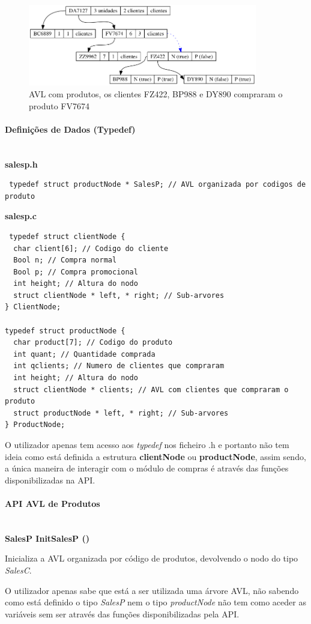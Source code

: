 \documentclass[10pt] {article}
\begin{document}
\begin{figure}[ht!]
\centering
\includegraphics[width=100mm]{avl_salesp.png}
\caption{AVL com produtos, os clientes FZ422, BP988 e DY890 compraram o produto FV7674}
\end{figure}
 
 \paragraph {Definições de Dados (Typedef)}\mbox{}\\
 \textbf{salesp.h}
 \begin{lstlisting}
 typedef struct productNode * SalesP; // AVL organizada por codigos de produto
 \end{lstlisting}
 \textbf{salesp.c}
 \begin{lstlisting}
 typedef struct clientNode {
  char client[6]; // Codigo do cliente
  Bool n; // Compra normal
  Bool p; // Compra promocional
  int height; // Altura do nodo
  struct clientNode * left, * right; // Sub-arvores
} ClientNode;

typedef struct productNode {
  char product[7]; // Codigo do produto
  int quant; // Quantidade comprada
  int qclients; // Numero de clientes que compraram
  int height; // Altura do nodo
  struct clientNode * clients; // AVL com clientes que compraram o produto
  struct productNode * left, * right; // Sub-arvores
} ProductNode;
\end{lstlisting}

 \par O utilizador apenas tem acesso aos \emph{typedef} nos ficheiro .h e portanto não tem ideia como está
 definida a estrutura \textbf{clientNode} ou \textbf{productNode}, assim sendo, a única maneira de interagir com o 
 módulo de compras é através das funções disponibilizadas na API.

\paragraph{API AVL de Produtos}\mbox{}\\
\textbf {SalesP InitSalesP ()}
 \par Inicializa a AVL organizada por código de produtos, devolvendo o nodo do tipo \emph{SalesC}.
 \par O utilizador apenas sabe que está a ser utilizada uma árvore AVL, não sabendo como está definido o tipo 
 \emph{SalesP} nem o tipo \emph{productNode} não tem como aceder as variáveis sem ser através das funções 
 disponibilizadas pela API. \\
\end{document}
